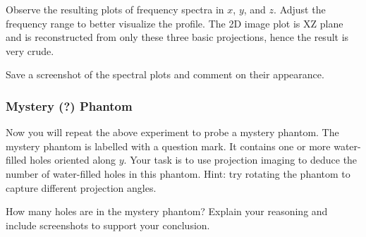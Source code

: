Observe the resulting plots of frequency spectra in $x$, $y$, and $z$. Adjust the frequency range to better visualize the profile. The 2D image plot is XZ plane and is reconstructed from only these three basic projections, hence the result is very crude.

\noindent{}\color{red}
Save a screenshot of the spectral plots and comment on their appearance.
\color{black}

\subsubsection{Mystery (?) Phantom}
Now you will repeat the above experiment to probe a mystery phantom. The mystery phantom is labelled with a question mark. It contains one or more water-filled holes oriented along $y$. Your task is to use projection imaging to deduce the number of water-filled holes in this phantom. Hint: try rotating the phantom to capture different projection angles.

\noindent{}\color{red}
How many holes are in the mystery phantom? Explain your reasoning and include screenshots to support your conclusion. 
\color{black}
